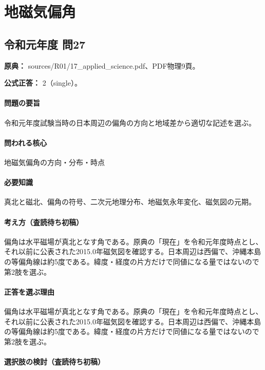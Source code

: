 \section{地磁気偏角}

\subsection{令和元年度 問27}
\label{q:r01-reg-applied-27}

\noindent\textbf{原典：} sources/R01/17\_applied\_science.pdf、PDF物理9頁。

\textbf{公式正答：} 2（single）。

\paragraph{問題の要旨} 令和元年度試験当時の日本周辺の偏角の方向と地域差から適切な記述を選ぶ。

\paragraph{問われる核心} 地磁気偏角の方向・分布・時点

\paragraph{必要知識} 真北と磁北、偏角の符号、二次元地理分布、地磁気永年変化、磁気図の元期。

\paragraph{考え方（査読待ち初稿）} 偏角は水平磁場が真北となす角である。原典の「現在」を令和元年度時点とし、それ以前に公表された2015.0年磁気図を確認する。日本周辺は西偏で、沖縄本島の等偏角線は約5度である。緯度・経度の片方だけで同値になる量ではないので第2肢を選ぶ。

\paragraph{正答を選ぶ理由} 偏角は水平磁場が真北となす角である。原典の「現在」を令和元年度時点とし、それ以前に公表された2015.0年磁気図を確認する。日本周辺は西偏で、沖縄本島の等偏角線は約5度である。緯度・経度の片方だけで同値になる量ではないので第2肢を選ぶ。

\paragraph{選択肢の検討（査読待ち初稿）}\mbox{}\par

